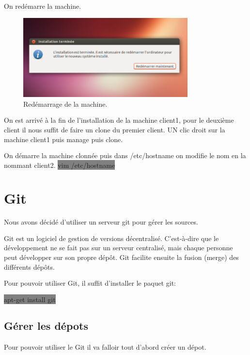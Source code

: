 \documentclass[11pt,a4paper,titlepage, oneside]{article}
\begin{document}
		\newpage
		On redémarre la machine.

	\begin{figure}[h]
                        \centering
                        \includegraphics[width=0.8\textwidth,natwidth=610,natheight=642]{images/demarrerISO7.png}
                        \caption{Redémarrage de la machine.}
                \end{figure}
	
		On est arrivé à la fin de l'installation de la machine client1, pour le deuxième client il nous suffit de faire un clone du premier client. UN clic droit sur la machine client1 puis manage puis clone.

	On démarre la machine clonnée puis dans /etc/hostname on modifie le nom en la nommant client2.
		\colorbox{gray}{vim /etc/hostname}

	
\newpage
\section{{\color{red} Git}}
	\paragraph{}
		Nous avons décidé d'utiliser un serveur git pour gérer les sources.
		
		Git est un logiciel de gestion de versions décentralisé. C'est-à-dire que le développement ne se fait pas sur un serveur centralisé, mais chaque personne peut développer sur son propre dépôt. Git facilite ensuite la fusion (merge) des différents dépôts.

		Pour pouvoir utiliser Git, il suffit d'installer le paquet git:
	
		\colorbox{gray} {apt-get install git}

	\subsection{{\color{blue} Gérer les dépots}}
		\paragraph{}
			Pour pouvoir utiliser le Git il va falloir tout d'abord créer un dépot.
			
\end{document}
